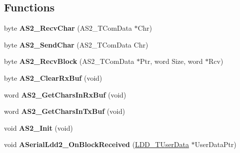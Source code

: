 \subsection*{Functions}
\begin{DoxyCompactItemize}
\item 
byte {\bfseries A\+S2\+\_\+\+Recv\+Char} (A\+S2\+\_\+\+T\+Com\+Data $\ast$Chr)\hypertarget{group___a_s2__module_ga74c0ea40957a6853dd4b3c7228a4cc8b}{}\label{group___a_s2__module_ga74c0ea40957a6853dd4b3c7228a4cc8b}

\item 
byte {\bfseries A\+S2\+\_\+\+Send\+Char} (A\+S2\+\_\+\+T\+Com\+Data Chr)\hypertarget{group___a_s2__module_ga8db8321e87885719d7537d4c2216133d}{}\label{group___a_s2__module_ga8db8321e87885719d7537d4c2216133d}

\item 
byte {\bfseries A\+S2\+\_\+\+Recv\+Block} (A\+S2\+\_\+\+T\+Com\+Data $\ast$Ptr, word Size, word $\ast$Rcv)\hypertarget{group___a_s2__module_ga1e321fdedefaea86a19c009c1acf0a05}{}\label{group___a_s2__module_ga1e321fdedefaea86a19c009c1acf0a05}

\item 
byte {\bfseries A\+S2\+\_\+\+Clear\+Rx\+Buf} (void)\hypertarget{group___a_s2__module_ga4c0fa98caeabd68ce717b505acf77a63}{}\label{group___a_s2__module_ga4c0fa98caeabd68ce717b505acf77a63}

\item 
word {\bfseries A\+S2\+\_\+\+Get\+Chars\+In\+Rx\+Buf} (void)\hypertarget{group___a_s2__module_ga05edb26f39a57b4f6d7b8e168d08d544}{}\label{group___a_s2__module_ga05edb26f39a57b4f6d7b8e168d08d544}

\item 
word {\bfseries A\+S2\+\_\+\+Get\+Chars\+In\+Tx\+Buf} (void)\hypertarget{group___a_s2__module_gabe75eb8f6eef9e5693d7b2debce2dd1f}{}\label{group___a_s2__module_gabe75eb8f6eef9e5693d7b2debce2dd1f}

\item 
void {\bfseries A\+S2\+\_\+\+Init} (void)\hypertarget{group___a_s2__module_gaa5da4b531c861ca0236bf12654a2659f}{}\label{group___a_s2__module_gaa5da4b531c861ca0236bf12654a2659f}

\item 
void {\bfseries A\+Serial\+Ldd2\+\_\+\+On\+Block\+Received} (\hyperlink{group___p_e___types__module_ga0b66a73f87238a782318aa0be7578e35}{L\+D\+D\+\_\+\+T\+User\+Data} $\ast$User\+Data\+Ptr)\hypertarget{group___a_s2__module_ga7a02cc6280b30d13707952d78f8e6c73}{}\label{group___a_s2__module_ga7a02cc6280b30d13707952d78f8e6c73}


\end{DoxyCompactItemize}
